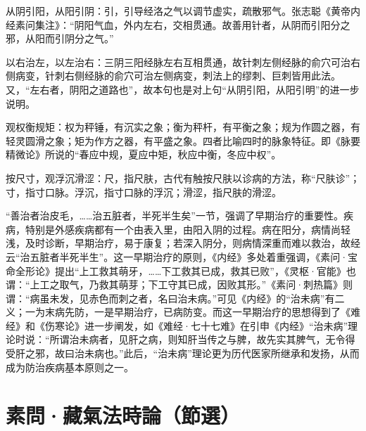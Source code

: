 \documentclass[12pt]{ctexbook}
\begin{document}
\begin{jiaozhu}
  \item 从阴引阳，从阳引阴：引，引导经洛之气以调节虚实，疏散邪气。张志聪《黄帝内经素问集注》：“阴阳气血，外内左右，交相贯通。故善用针者，从阴而引阳分之邪，从阳而引阴分之气。”
  \item 以右治左，以左治右：三阴三阳经脉左右互相贯通，故针刺左侧经脉的俞穴可治右侧病变，针刺右侧经脉的俞穴可治左侧病变，刺法上的缪刺、巨刺皆用此法。又，“左右者，阴阳之道路也”，故本句也是对上句“从阴引阳，从阳引明”的进一步说明。
  \item 观权衡规矩：权为秤锤，有沉实之象；衡为秤杆，有平衡之象；规为作圆之器，有轻灵圆滑之象；矩为作方之器，有平盛之象。四者比喻四时的脉象特征。即《脉要精微论》所说的“春应中规，夏应中矩，秋应中衡，冬应中权”。
  \item 按尺寸，观浮沉滑涩：尺，指尺肤，古代有触按尺肤以诊病的方法，称“尺肤诊”；寸，指寸口脉。浮沉，指寸口脉的浮沉；滑涩，指尺肤的滑涩。
\end{jiaozhu}



“善治者治皮毛，……治五脏者，半死半生矣”一节，强调了早期治疗的重要性。疾病，特别是外感疾病都有一个由表入里，由阳入阴的过程。病在阳分，病情尚轻浅，及时诊断，早期治疗，易于康复；若深入阴分，则病情深重而难以救治，故经云“治五脏者半死半生”。这一早期治疗的原则，《内经》多处着重强调，《素问·宝命全形论》提出“上工救其萌牙，……下工救其已成，救其已败”，《灵枢·官能》也谓：“上工之取气，乃救其萌芽；下工守其已成，因败其形。”《素问·刺热篇》则谓：“病虽未发，见赤色而刺之者，名曰治未病。”可见《内经》的“治未病”有二义；一为末病先防，一是早期治疗，已病防变。而这一早期治疗的思想得到了《难经》和《伤寒论》进一步阐发，如《难经·七十七难》在引申《内经》“治未病”理论时说：“所谓治未病者，见肝之病，则知肝当传之与脾，故先实其脾气，无令得受肝之邪，故曰治未病也。”此后，“治未病”理论更为历代医家所继承和发扬，从而成为防治疾病基本原则之一。

\section{素問·藏氣法時論（節選）}%

\end{document}
